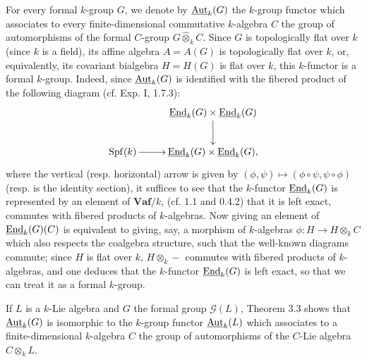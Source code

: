 For every formal $k$-group $G$, we denote by $\underline{\operatorname{Aut}}_k(G)$ the $k$-group functor which associates to every finite-dimensional commutative $k$-algebra $C$ the group of automorphisms of the formal $C$-group $G\widehat\otimes_k C$. Since $G$ is topologically flat over $k$ (since $k$ is a field), \ie its affine algebra $A=A(G)$ is topologically flat over $k$, or, equivalently, its covariant bialgebra $H=H(G)$ is flat over $k$, this $k$-functor is a formal $k$-group. Indeed, since $\underline{\operatorname{Aut}}_k(G)$ is identified with the fibered product of the following diagram (cf. Exp. I, 1.7.3):
\[
\xymatrix@C=26pt{
&\underline{\End}_k(G)\times\underline{\End}_k(G)\ar[d]\\
\Spf(k)\ar[r]&\underline{\End}_k(G)\times\underline{\End}_k(G),}
\]
where the vertical (resp. horizontal) arrow is given by $(\phi,\psi)\mapsto(\phi\circ\psi,\psi\circ\phi)$ (resp. is the identity section), it suffices to see that the $k$-functor $\underline{\operatorname{End}}_k(G)$ is represented by an element of $\mathbf{Vaf}/k$, \ie (cf. 1.1 and 0.4.2) that it is left exact, \ie commutes with fibered products of $k$-algebras.
Now giving an element of $\underline{\operatorname{End}}_k(G)(C)$ is equivalent to giving, say, a morphism of $k$-algebras $\phi:H\to H\otimes_k C$ which also respects the coalgebra structure, \ie such that the well-known diagrams commute; since $H$ is flat over $k$, $H\otimes_k-$ commutes with fibered products of $k$-algebras, and one deduces that the $k$-functor $\underline{\operatorname{End}}_k(G)$ is left exact, so that we can treat it as a formal $k$-group.

If $L$ is a $k$-Lie algebra and $G$ the formal group $\mathscr G(L)$, Theorem 3.3 shows that $\underline{\operatorname{Aut}}_k(G)$ is isomorphic to the $k$-group functor $\underline{\operatorname{Aut}}_k(L)$ which associates to a finite-dimensional $k$-algebra $C$ the group of automorphisms of the $C$-Lie algebra $C\otimes_k L$.

